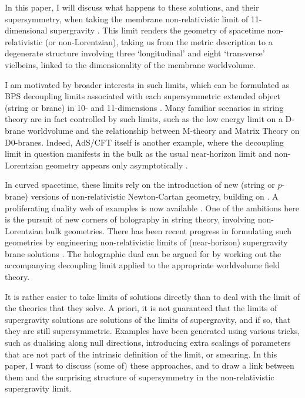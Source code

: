 \documentclass[11pt]{article}
\numberwithin{equation}{section}
\begin{document}
In this paper, I will discuss what happens to these solutions, and their supersymmetry, when taking the membrane non-relativistic limit of 11-dimensional supergravity \cite{Blair:2021waq, Bergshoeff:2024nin}.
This limit renders the geometry of spacetime non-relativistic (or non-Lorentzian), taking us from the metric description to a degenerate structure involving three `longitudinal' and eight `transverse' vielbeins, linked to the dimensionality of the membrane worldvolume.

I am motivated by broader interests in such limits, which can be formulated as BPS decoupling limits associated with each supersymmetric extended object (string or brane) in 10- and 11-dimensions \cite{Gomis:2000bd, Danielsson:2000gi,Blair:2023noj}.
Many familiar scenarios in string theory are in fact controlled by such limits, such as the low energy limit on a D-brane worldvolume and the relationship between M-theory and Matrix Theory on D0-branes. 
Indeed, AdS/CFT itself is another example, where the decoupling limit in question manifests in the bulk as the usual near-horizon limit and non-Lorentzian geometry appears only asymptotically \cite{Blair:2024aqz}.

In curved spacetime, these limits rely on the introduction of new (string or $p$-brane) versions of non-relativistic Newton-Cartan geometry, building on \cite{Andringa:2012uz,Harmark:2017rpg, Bergshoeff:2018yvt}.
A proliferating duality web of examples is now available \cite{Blair:2023noj,Gomis:2023eav}.
One of the ambitions here is the pursuit of new corners of holography in string theory, involving non-Lorentzian bulk geometries.
There has been recent progress in formulating such geometries by engineering non-relativistic limits of (near-horizon) supergravity brane solutions \cite{Lambert:2024uue, Lambert:2024yjk,Fontanella:2024rvn,Fontanella:2024kyl, Blair:2024aqz,Lambert:2024ncn,Harmark:2025ikv,Guijosa:2025mwh,Blair:2025prd}. The holographic dual can be argued for by working out the accompanying decoupling limit applied to the appropriate worldvolume field theory.

It is rather easier to take limits of solutions directly than to deal with the limit of the theories that they solve.
A priori, it is not guaranteed that the limits of supergravity solutions are solutions of the limits of supergravity, and if so, that they are still supersymmetric.
Examples have been generated using various tricks, such as dualising along null directions, introducing extra scalings of parameters that are not part of the intrinsic definition of the limit, or smearing.
In this paper, I want to discuss (some of) these approaches, and to draw a link between them and the surprising structure of supersymmetry in the non-relativistic supergravity limit.
\end{document}
